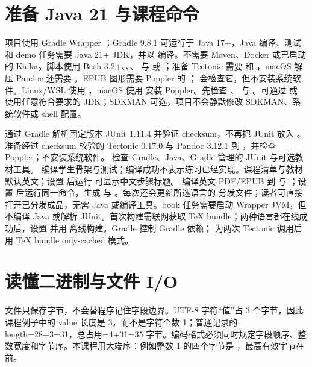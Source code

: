 \section{准备 Java 21 与课程命令}
项目使用 Gradle Wrapper ；Gradle 9.8.1 可运行于 Java 17+，Java 编译、测试和 demo 任务需要 Java 21+ JDK，并以  编译。不需要 Maven、Docker 或已启动的 Kafka。脚本使用 Bash 3.2+、、、 与  或 ；准备 Tectonic 需要  和 ，macOS 解压 Pandoc 还需要 。EPUB 图形需要 Poppler 的 ； 会检查它，但不安装系统软件。Linux/WSL 使用 ，macOS 使用  安装 Poppler。先检查 、 与 。可通过  或  使用任意符合要求的 JDK；SDKMAN 可选，项目不会静默修改 SDKMAN、系统软件或 shell 配置。

 通过 Gradle 解析固定版本 JUnit 1.11.4 并验证 checksum，不再把 JUnit 放入 。 准备经过 checksum 校验的 Tectonic 0.17.0 与 Pandoc 3.12.1 到 ，并检查 Poppler；不安装系统软件。 检查 Gradle、Java、Gradle 管理的 JUnit 与可选教材工具。 编译学生骨架与测试；编译成功不表示练习已经实现。课程清单与教材默认英文；设置  后运行  可显示中文步骤标题。 编译英文 PDF/EPUB 到  与 ；设置  后运行同一命令，生成  与 。每次还会更新所选语言的  分发文件；读者可直接打开已分发成品，无需 Java 或编译工具。book 任务需要启动 Wrapper JVM，但不编译 Java 或解析 JUnit。首次构建需联网获取 TeX bundle；两种语言都在线成功后，设置  并用  离线构建。Gradle  控制 Gradle 依赖； 为两次 Tectonic 调用启用 TeX bundle only-cached 模式。

\section{读懂二进制与文件 I/O}
文件只保存字节，不会替程序记住字段边界。UTF-8 字符“值”占 3 个字节，因此课程例子中的 value 长度是 3，而不是字符个数 1；普通记录的 length=28+3=31，总占用=4+31=35 字节。编码格式必须同时规定字段顺序、整数宽度和字节序。本课程用大端序：例如整数 1 的四个字节是 ，最高有效字节在前。


